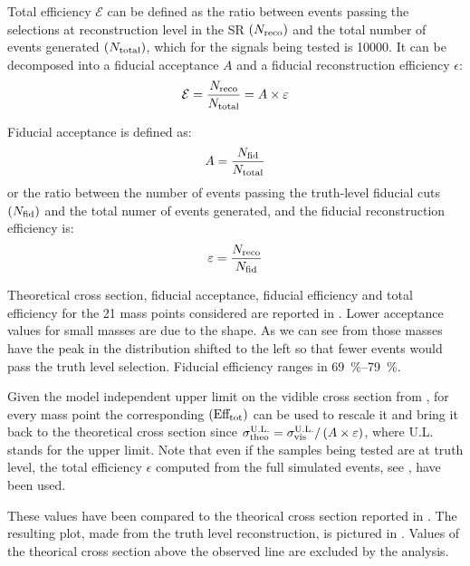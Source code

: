 Total efficiency $\mathcal{E}$ can be defined as the ratio between events passing the selections at reconstruction level in the SR $\left(N_\textup{reco}\right)$ and the total number of events generated $\left(N_\textup{total}\right)$, which for the signals being tested is \num{10000}. It can be decomposed into a fiducial acceptance $A$ and a fiducial reconstruction efficiency $\epsilon$:
\begin{equation}
	\mathcal{E}=\frac{N_\textup{reco}}{N_\textup{total}}=A\times\epsilon
\end{equation}

Fiducial acceptance is defined as:
\begin{equation}
	A=\frac{N_\textup{fid}}{N_\textup{total}}
	\label{eqn:accfid}
\end{equation}
or the ratio between the number of events passing the truth-level fiducial cuts $\left(N_\textup{fid}\right)$ and the total numer of events generated, and the fiducial reconstruction efficiency is:
\begin{equation}
	\epsilon=\frac{N_\textup{reco}}{N_\textup{fid}}
	\label{eqn:efffid}
\end{equation}

Theoretical cross section, fiducial acceptance, fiducial efficiency and total efficiency for the \num{21} mass points considered are reported in \Tab{\ref{tab:eff}}. Lower acceptance values for small masses are due to the \met shape. As we can see from \Fig{\ref{fig:validation}} those masses have the peak in the \met distribution shifted to the left so that fewer events would pass the truth level selection. Fiducial efficiency ranges in \SIrange{69}{79}{\percent}.

Given the model independent upper limit on the vidible cross section from \Tab{\ref{table.results.exclxsec.pval.upperlimit.SR}}, for every mass point the corresponding $\left(\text{Eff}_\textup{tot}\right)$ can be used to rescale it and bring it back to the theoretical cross section since $\sigma_\textup{theo}^\textup{U.L.}=\sigma_\textup{vis}^\textup{U.L.}/\left(A\times\epsilon\right)$, where U.L. stands for the \sv upper limit. Note that even if the samples being tested are at truth level, the total efficiency $\epsilon$ computed from the full simulated events, see \Sect{\ref{sec:full}}, have been used.

These values have been compared to the theorical cross section reported in \Tab{\ref{tab:eff}}. The resulting plot, made from the truth level reconstruction, is pictured in \Fig{\ref{subfig:exclMI}}. Values of the theorical cross section above the observed line are excluded by the analysis.

